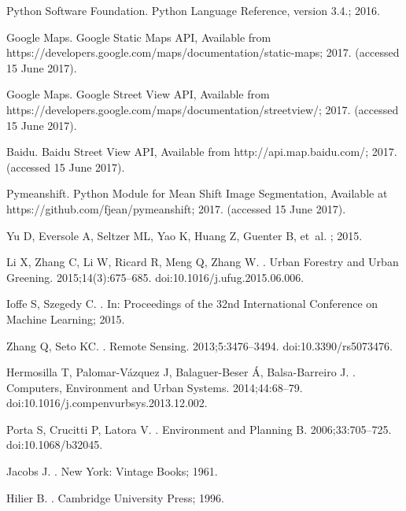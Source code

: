 {Python Software Foundation}. {Python Language Reference, version 3.4.}; 2016.

{Google Maps}. {Google Static Maps API, Available from
  https://developers.google.com/maps/documentation/static-maps}; 2017.
\newblock (accessed 15 June 2017).

{Google Maps}. {Google Street View API, Available from
  https://developers.google.com/maps/documentation/streetview/}; 2017.
\newblock (accessed 15 June 2017).

Baidu. {Baidu Street View API, Available from http://api.map.baidu.com/}; 2017.
\newblock (accessed 15 June 2017).

Pymeanshift. {Python Module for Mean Shift Image Segmentation, Available at
  https://github.com/fjean/pymeanshift}; 2017.
\newblock (accessed 15 June 2017).

Yu D, Eversole A, Seltzer ML, Yao K, Huang Z, Guenter B, et~al.
; 2015.

Li X, Zhang C, Li W, Ricard R, Meng Q, Zhang W.
.
\newblock Urban Forestry and Urban Greening. 2015;14(3):675--685.
\newblock doi:{10.1016/j.ufug.2015.06.006}.

Ioffe S, Szegedy C.
.
\newblock In: Proceedings of the 32nd International Conference on Machine
  Learning; 2015.

Zhang Q, Seto KC.
.
\newblock Remote Sensing. 2013;5:3476--3494.
\newblock doi:{10.3390/rs5073476}.

Hermosilla T, Palomar-V{\'{a}}zquez J, Balaguer-Beser {\'{A}}, Balsa-Barreiro
  J.
.
\newblock Computers, Environment and Urban Systems. 2014;44:68--79.
\newblock doi:{10.1016/j.compenvurbsys.2013.12.002}.

Porta S, Crucitti P, Latora V.
.
\newblock Environment and Planning B. 2006;33:705--725.
\newblock doi:{10.1068/b32045}.


Jacobs J.
.
\newblock New York: Vintage Books; 1961.

Hilier B.
.
\newblock Cambridge University Press; 1996.